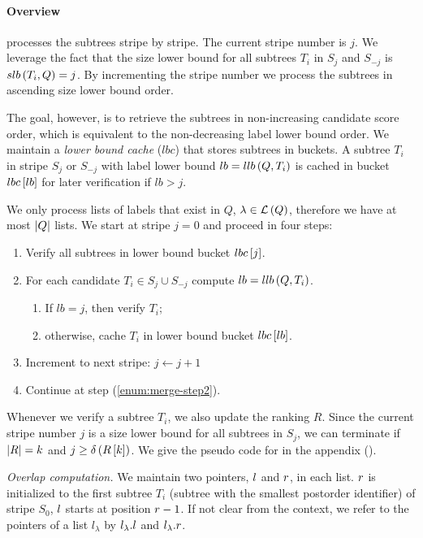 \paragraph{Overview}

\lowerboundmerge{} processes the subtrees stripe by stripe.  The current stripe number is $j$. We leverage the fact that the size lower bound for all subtrees $T_i$ in $S_j$ and $S_{-j}$ is $slb \left( T_i, Q \right) = j$. By incrementing the stripe number we process the subtrees in ascending size lower bound order.

The goal, however, is to retrieve the subtrees in non-increasing candidate score order, which is equivalent to the non-decreasing label lower bound order. We maintain a \emph{lower bound cache} ($lbc$) that stores subtrees in buckets. A subtree $T_i$ in stripe $S_j$ or $S_{-j}$  with label lower bound $lb = llb \left( Q, T_i \right)$ is cached in bucket $lbc\left[ lb \right]$ for later verification if $lb > j$.

We only process lists of labels that exist in $Q$, $\lambda \in \mathcal{L} \left( Q \right)$, therefore we have at most $\left| Q \right|$ lists. We start at stripe $j = 0$ and proceed in four steps:

\begin{enumerate}
  \item\label{enum:merge-step2} Verify all subtrees in lower bound bucket $lbc\left[ j \right]$.
  \item For each candidate $T_i \in S_j \cup S_{-j}$ compute $lb = llb \left( Q, T_i \right)$.
  \begin{enumerate}
    \item If $lb = j$, then verify $T_i$;
    \item otherwise, cache $T_i$ in lower bound bucket $lbc\left[ lb \right]$.
  \end{enumerate}
  \item \label{enum:emptystripe} Increment to next stripe: $j \gets j + 1$
  \item Continue at step (\ref{enum:merge-step2}).
\end{enumerate}

Whenever we verify a subtree $T_i$, we also update the ranking $R$. Since the current stripe number $j$ is a size lower bound for all subtrees in $S_j$, we  can terminate if $\left| R \right| = k$ and $j \geq \delta \left( R\left[ k \right] \right)$.
We give the pseudo code for \lowerboundmerge{} in the appendix ().

\emph{Overlap computation.} We maintain two pointers, $l$ and $r$, in each list. $r$ is initialized to the first subtree $T_i$ (subtree with the smallest postorder identifier) of stripe $S_0$, $l$ starts at position $r - 1$. If not clear from the context, we refer to the pointers of a list $l_\lambda$ by $l_\lambda.l$ and $l_\lambda.r$.

